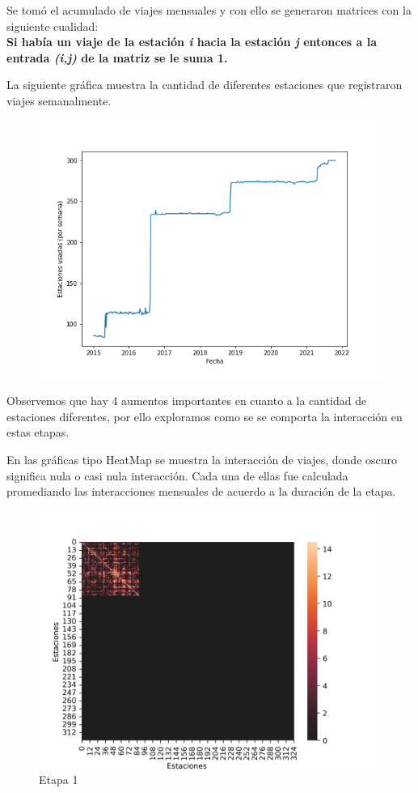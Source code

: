 \documentclass[
]{article}
\begin{document}
Se tomó el acumulado de viajes mensuales y con ello se generaron
matrices con la siguiente cualidad:\\
\textbf{Si había un viaje de la estación \emph{i} hacia la estación
\emph{j} entonces a la entrada \emph{(i,j)} de la matriz se le suma 1.}

La siguiente gráfica muestra la cantidad de diferentes estaciones que
registraron viajes semanalmente.

\begin{figure}
\centering
\includegraphics{../plots/stations_weekly.png}
\caption{}
\end{figure}

Observemos que hay 4 aumentos importantes en cuanto a la cantidad de
estaciones diferentes, por ello exploramos como se se comporta la
interacción en estas etapas.

En las gráficas tipo HeatMap se muestra la interacción de viajes, donde
oscuro significa nula o casi nula interacción. Cada una de ellas fue
calculada promediando las interacciones mensuales de acuerdo a la
duración de la etapa.

\begin{figure}
\centering
\includegraphics{../plots/resultsUno.png}
\caption{Etapa 1}
\end{figure}
\end{document}

